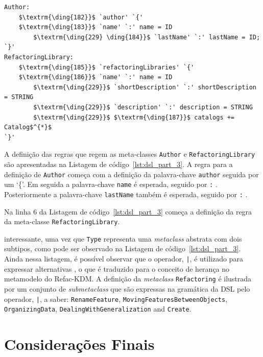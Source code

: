 \begin{lstlisting}[language=Xtext, frame=single, basicstyle=\scriptsize, mathescape=true, label={lst:dsl_part_3}, caption={Gramática da DSL - parte 3}]
Author:
	$\textrm{\ding{182}}$ `author' `{'
	$\textrm{\ding{183}}$ `name' `:' name = ID  
		$\textrm{\ding{229} \ding{184}}$ `lastName' `:' lastName = ID; 
`}'
RefactoringLibrary:
	$\textrm{\ding{185}}$ `refactoringLibraries' `{'
	$\textrm{\ding{186}}$ `name' `:' name = ID  
		$\textrm{\ding{229}}$ `shortDescription' `:' shortDescription = STRING
		$\textrm{\ding{229}}$ `description' `:' description = STRING
		$\textrm{\ding{229}}$ $\textrm{\ding{187}}$ catalogs += Catalog$^{*}$
`}'
\end{lstlisting}

A definição das regras que regem as meta-classes \texttt{Author} e \texttt{RefactoringLibrary} são apresentadas  na Listagem de código~\ref{lst:dsl_part_3}. A regra para a definição de \texttt{Author} começa com a definição da palavra-chave \texttt{author} seguida por um `\{'. Em seguida a palavra-chave \texttt{name} é esperada, seguido por \texttt{:} . Posteriormente a palavra-chave \texttt{lastName} também é esperada, seguido por \texttt{:} . 

Na linha 6 da Listagem de código~\ref{lst:dsl_part_3} começa a definição da regra da meta-classe \texttt{RefactoringLibrary}.



interessante, uma vez que \texttt{Type} representa uma \textit{metaclass} abstrata com dois subtipos, como pode ser observado na Listagem de código~\ref{lst:dsl_part_3}. Ainda nessa listagem, é possível observar que o operador, \texttt{|}, é utilizado para expressar alternativas , o que é traduzido para o conceito de herança no metamodelo do Refac-KDM. A definição da \textit{metaclass} \texttt{Refactoring} é ilustrada por um conjunto de \textit{submetaclass}  que são expressas na gramática da DSL pelo operador, \texttt{|}, a saber: \texttt{RenameFeature}, \texttt{MovingFeaturesBetweenObjects}, \texttt{OrganizingData}, \texttt{DealingWithGeneralization} and \texttt{Create}.

\section{Considerações Finais}
\label{sec:consideracoes_finais}

